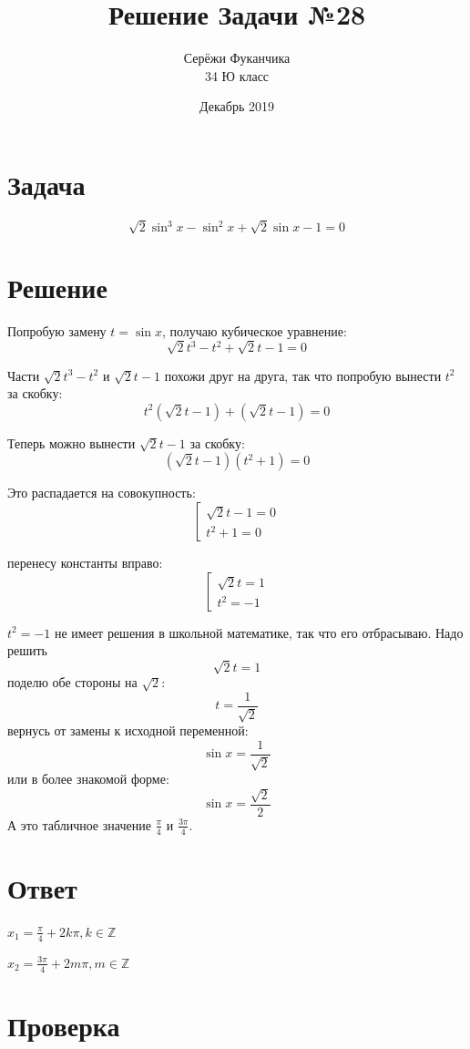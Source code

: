 \documentclass{article}
\title{Решение Задачи №28}
\author{Серёжи Фуканчика\\34 Ю класс}
\date{Декабрь 2019}
\begin{document}
\maketitle

\section{Задача}
\begin{equation}
\sqrt{2}\sin^3{x}-\sin^2{x}+\sqrt{2}\sin{x}-1=0
\end{equation}

\section{Решение}
Попробую замену $t=\sin{x}$, получаю кубическое уравнение:
\begin{equation}
\sqrt{2}t^3-t^2+\sqrt{2}t-1=0
\end{equation}

Части $\sqrt{2}t^3-t^2$ и $\sqrt{2}t-1$ похожи друг на друга, так что попробую вынести $t^2$ за скобку:
\begin{equation}
t^2(\sqrt{2}t-1)+(\sqrt{2}t-1)=0
\end{equation}

Теперь можно вынести $\sqrt{2}t-1$ за скобку:
\begin{equation}
(\sqrt{2}t-1)(t^2+1)=0
\end{equation}

Это распадается на совокупность:
\begin{equation*}
\left[
\begin{array}{l}
\sqrt{2}t-1 = 0 \\
t^2+1 = 0
\end{array}
\right.
\end{equation*}

перенесу константы вправо:
\begin{equation*}
\left[
\begin{array}{l}
\sqrt{2}t = 1 \\
t^2 = -1
\end{array}
\right.
\end{equation*}

$t^2 = -1$ не имеет решения в школьной математике, так что его отбрасываю. Надо решить
$$
\sqrt{2}t = 1
$$
поделю обе стороны на $\sqrt{2}$:
$$
t = \frac{1}{\sqrt{2}}
$$
вернусь от замены к исходной переменной:
$$
\sin{x} = \frac{1}{\sqrt{2}}
$$
или в более знакомой форме:
$$
\sin{x} = \frac{\sqrt{2}}{2}
$$
А это табличное значение $\frac{\pi}{4}$ и $\frac{3\pi}{4}$.

\section{Ответ}
$x_1=\frac{\pi}{4}+2k\pi,k\in\mathbb{Z}$

$x_2=\frac{3\pi}{4}+2m\pi,m\in\mathbb{Z}$

\section{Проверка}
\end{document}
